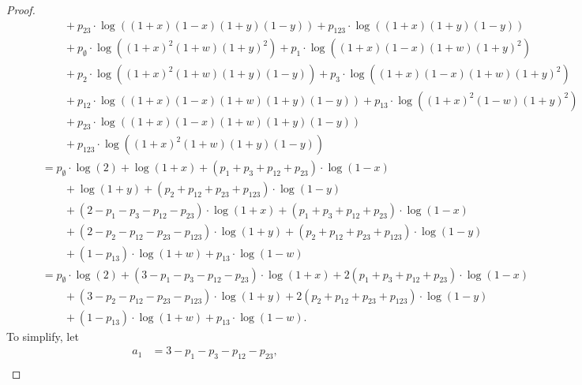 \begin{proof}
\begin{align*}
    &\qquad\qquad + p_{23}         \cdot\log((1+x)(1-x)(1+y)(1-y))
+ p_{123}        \cdot\log((1+x)(1+y)(1-y)) \\
    &\qquad\qquad + p_{\emptyset}  \cdot\log((1+x)^2   (1+w)(1+y)^2)
+ p_{1}          \cdot\log((1+x)(1-x)(1+w)(1+y)^2) \\
    &\qquad\qquad + p_{2}          \cdot\log((1+x)^2   (1+w)(1+y)(1-y))
+ p_{3}          \cdot\log((1+x)(1-x)(1+w)(1+y)^2) \\
    &\qquad\qquad + p_{12}         \cdot\log((1+x)(1-x)(1+w)(1+y)(1-y))
+ p_{13}         \cdot\log((1+x)^2   (1-w)(1+y)^2) \\
    &\qquad\qquad + p_{23}         \cdot\log((1+x)(1-x)(1+w)(1+y)(1-y)) \\
    &\qquad\qquad + p_{123}        \cdot\log((1+x)^2   (1+w)(1+y)(1-y)) \\
&\qquad =      p_{\emptyset}  \cdot\log(2)
+ \log(1+x)
+ (p_{1}+p_{3}+p_{12}+p_{23})\cdot\log(1-x) \\
&\qquad\qquad + \log(1+y)
+ (p_{2}+p_{12}+p_{23}+p_{123})\cdot\log(1-y) \\
&\qquad\qquad + (2-p_{1}-p_{3}-p_{12}-p_{23})\cdot\log(1+x)
+ (p_{1}+p_{3}+p_{12}+p_{23})\cdot\log(1-x) \\
&\qquad\qquad + (2-p_{2}-p_{12}-p_{23}-p_{123})\cdot\log(1+y)
+ (p_{2}+p_{12}+p_{23}+p_{123})\cdot\log(1-y) \\
&\qquad\qquad + (1-p_{13})\cdot\log(1+w)
+ p_{13}\cdot\log(1-w) \\
&\qquad =      p_{\emptyset}  \cdot\log(2)
+ (3-p_{1}-p_{3}-p_{12}-p_{23})\cdot\log(1+x)
+ 2(p_{1}+p_{3}+p_{12}+p_{23})\cdot\log(1-x) \\
&\qquad\qquad + (3-p_{2}-p_{12}-p_{23}-p_{123})\cdot\log(1+y)
+ 2(p_{2}+p_{12}+p_{23}+p_{123})\cdot\log(1-y) \\
&\qquad\qquad + (1-p_{13})\cdot\log(1+w)
+ p_{13}\cdot\log(1-w).
\end{align*}
To simplify, let
\begin{equation}
    \begin{aligned}
        a_{1} &= 3-p_{1}-p_{3}-p_{12}-p_{23}, \\

\end{aligned}
\end{equation}
\end{proof}
